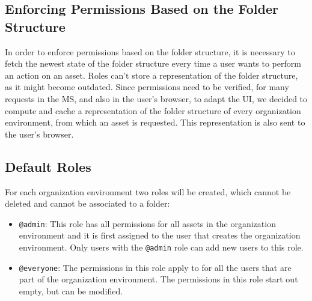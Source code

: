 \subsection{Enforcing Permissions Based on the Folder Structure}

In order to enforce permissions based on the folder structure, it is necessary to fetch
the newest state of the folder structure every time a user wants to perform an action on an asset.
Roles can't store a representation of the folder structure, as it might become outdated.
Since permissions need to be verified, for many requests in the MS, and also in the user's browser, to
adapt the UI, we decided to compute and cache a representation of the folder structure of
every organization environment, from which an asset is requested.
This representation is also sent to the user's browser.


\subsection{Default Roles}

For each organization environment two roles will be created, which cannot be deleted and
cannot be associated to a folder:

\begin{itemize}
	\item \lstinline{@admin}: This role has all permissions for all assets in the
	      organization environment and it is first assigned to the user that creates the organization environment.
	      Only users with the \lstinline{@admin} role can add new users to this role.
	\item \lstinline{@everyone}: The permissions in this role apply to for all the users
	      that are part of the organization environment. The permissions in this role start out
	      empty, but can be modified.
\end{itemize}
